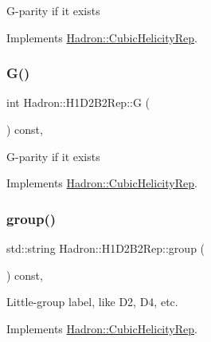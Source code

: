G-\/parity if it exists 

Implements \mbox{\hyperlink{structHadron_1_1CubicHelicityRep_a50689f42be1e6170aa8cf6ad0597018b}{Hadron\+::\+Cubic\+Helicity\+Rep}}.

\mbox{\label{structHadron_1_1H1D2B2Rep_a8a24864ed3b1e7faee9eee169fc3470b}} 
\subsubsection{\texorpdfstring{G()}{G()}\hspace{0.1cm}{\footnotesize\ttfamily [2/2]}}
{\footnotesize\ttfamily int Hadron\+::\+H1\+D2\+B2\+Rep\+::G (\begin{DoxyParamCaption}{ }\end{DoxyParamCaption}) const\hspace{0.3cm}{\ttfamily [inline]}, {\ttfamily [virtual]}}

G-\/parity if it exists 

Implements \mbox{\hyperlink{structHadron_1_1CubicHelicityRep_a50689f42be1e6170aa8cf6ad0597018b}{Hadron\+::\+Cubic\+Helicity\+Rep}}.

\mbox{\label{structHadron_1_1H1D2B2Rep_ab0fa365d2ca739de8c62328e3e053deb}} 
\subsubsection{\texorpdfstring{group()}{group()}\hspace{0.1cm}{\footnotesize\ttfamily [1/3]}}
{\footnotesize\ttfamily std\+::string Hadron\+::\+H1\+D2\+B2\+Rep\+::group (\begin{DoxyParamCaption}{ }\end{DoxyParamCaption}) const\hspace{0.3cm}{\ttfamily [inline]}, {\ttfamily [virtual]}}

Little-\/group label, like D2, D4, etc. 

Implements \mbox{\hyperlink{structHadron_1_1CubicHelicityRep_a101a7d76cd8ccdad0f272db44b766113}{Hadron\+::\+Cubic\+Helicity\+Rep}}.

\mbox{\label{structHadron_1_1H1D2B2Rep_ab0fa365d2ca739de8c62328e3e053deb}} 
